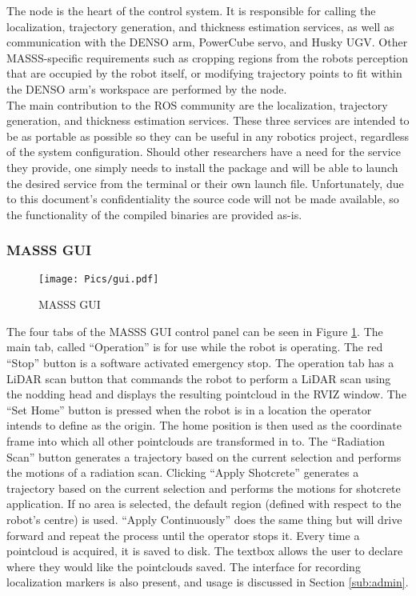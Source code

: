 The  node is the heart of the control system. It is responsible for calling the localization, trajectory generation, and thickness estimation services, as well as communication with the DENSO arm, PowerCube servo, and Husky UGV. Other MASSS-specific requirements such as cropping regions from the robots perception that are occupied by the robot itself, or  modifying trajectory points to fit within the DENSO arm's workspace are performed by the  node. \\

The main contribution to the ROS community are the localization, trajectory generation, and thickness estimation services. These three services are intended to be as portable as possible so they can be useful in any robotics project, regardless of the system configuration. Should other researchers have a need for the service they provide, one simply needs to install the package and will be able to launch the desired service from the terminal or their own launch file. Unfortunately, due to this document's confidentiality the source code will not be made available, so the functionality of the compiled binaries are provided as-is.\\

\subsubsection{MASSS GUI}
\label{sub:gui}

\begin{figure}[ht!]
    \centering
    \texttt{[image: Pics/gui.pdf]}
    \caption{MASSS GUI}
    \label{fig:thegui}
\end{figure}

The four tabs of the MASSS GUI control panel can be seen in Figure \ref{fig:thegui}. The main tab, called ``Operation'' is for use while the robot is operating. The red ``Stop'' button is a software activated emergency stop. The operation tab has a LiDAR scan button that commands the robot to perform a LiDAR scan using the nodding head and displays the resulting pointcloud in the RVIZ window. The ``Set Home'' button is pressed when the robot is in a location the operator intends to define as the origin. The home position is then used as the coordinate frame into which all other pointclouds are transformed in to. The ``Radiation Scan'' button generates a trajectory based on the current selection and performs the motions of a radiation scan. Clicking ``Apply Shotcrete'' generates a trajectory based on the current selection and performs the motions for shotcrete application. If no area is selected, the default region (defined with respect to the robot's centre) is used. ``Apply Continuously'' does the same thing but will drive forward and repeat the process until the operator stops it. Every time a pointcloud is acquired, it is saved to disk. The textbox allows the user to declare where they would like the pointclouds saved. The interface for recording localization markers is also present, and usage is discussed in Section \ref{sub:admin}.\\

